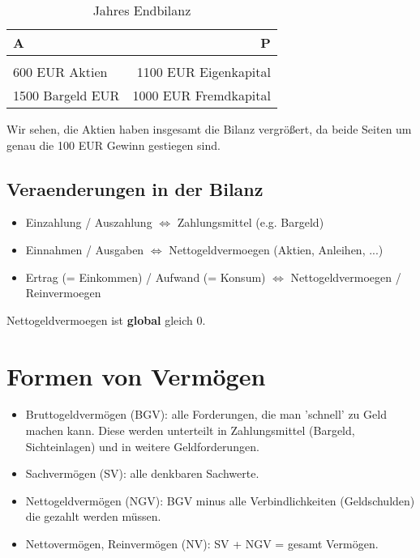 \documentclass[a4paper]{article}
\begin{document}
\begin{table}
	\centering
	\caption{Jahres Endbilanz}
	\label{tab:label}
	\begin{tabular}{l|r}
		A                & P                     \\
		\hline                                   \\
		600 EUR Aktien   & 1100 EUR Eigenkapital \\
		1500 Bargeld EUR & 1000 EUR Fremdkapital \\
	\end{tabular}
\end{table}

Wir sehen, die Aktien haben insgesamt die Bilanz vergrößert, da beide Seiten
um genau die 100 EUR Gewinn gestiegen sind.

\subsection{
	Veraenderungen in der Bilanz
}

\begin{itemize}
	\item Einzahlung / Auszahlung $\Leftrightarrow$ Zahlungsmittel (e.g. Bargeld)
	\item Einnahmen / Ausgaben $\Leftrightarrow$ Nettogeldvermoegen (Aktien, Anleihen, ...)
	\item Ertrag (= Einkommen) / Aufwand (= Konsum) $\Leftrightarrow$
	      Nettogeldvermoegen / Reinvermoegen
\end{itemize}

Nettogeldvermoegen ist \textbf{global} gleich 0.

\section{Formen von Vermögen}

\begin{itemize}
	\item Bruttogeldvermögen (BGV): alle Forderungen, die man 'schnell' zu Geld machen
	      kann. Diese werden unterteilt in Zahlungsmittel
	      (Bargeld, Sichteinlagen) und in weitere Geldforderungen.

	\item Sachvermögen (SV): alle denkbaren Sachwerte.

	\item Nettogeldvermögen (NGV): BGV minus alle Verbindlichkeiten (Geldschulden)
	      die gezahlt werden müssen.

	\item Nettovermögen, Reinvermögen (NV): SV + NGV = gesamt Vermögen.
\end{itemize}
\end{document}
